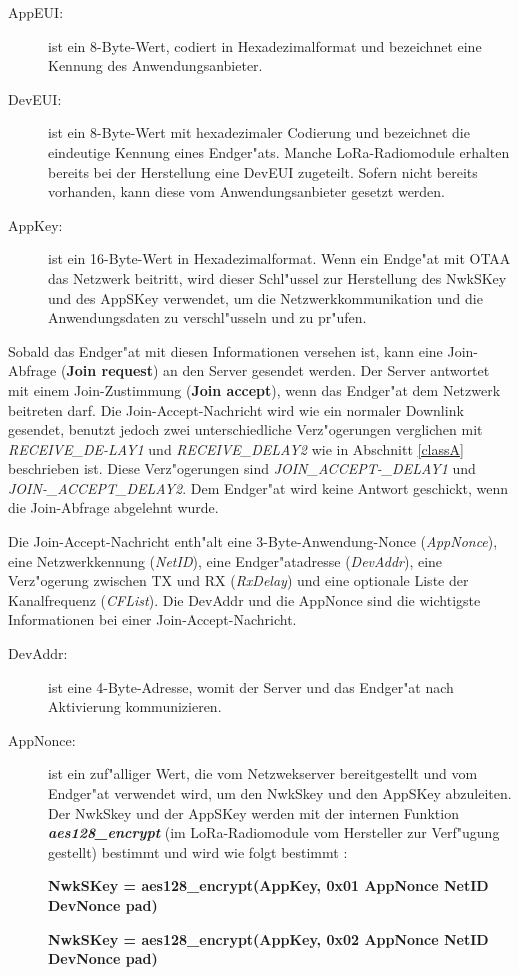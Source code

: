 \begin{description}
	\item[AppEUI:] ist ein 8-Byte-Wert, codiert in Hexadezimalformat und 
	bezeichnet eine Kennung des Anwendungsanbieter.
	\item[DevEUI:] ist ein 8-Byte-Wert mit hexadezimaler Codierung und 
	bezeichnet die eindeutige Kennung eines Endger"ats. Manche 
	LoRa-Radiomodule erhalten bereits bei der Herstellung eine DevEUI zugeteilt. 
	Sofern nicht bereits vorhanden, kann diese vom Anwendungsanbieter gesetzt 
	werden.
	\item[AppKey:] ist ein 16-Byte-Wert in Hexadezimalformat. Wenn ein 
	Endge"at mit OTAA das Netzwerk beitritt, wird dieser Schl"ussel zur 
	Herstellung des NwkSKey und des AppSKey verwendet, um die 
	Netzwerkkommunikation und die Anwendungsdaten zu verschl"usseln und 
	zu pr"ufen. 
\end{description}

Sobald das Endger"at mit diesen Informationen versehen ist, kann eine 
Join-Abfrage (\textbf{Join request}) an den Server gesendet werden. Der Server 
antwortet mit einem Join-Zustimmung (\textbf{Join accept}), wenn das 
Endger"at dem Netzwerk beitreten darf. Die Join-Accept-Nachricht wird 
wie ein normaler Downlink gesendet, benutzt jedoch zwei unterschiedliche 
Verz"ogerungen verglichen mit \textit{RECEIVE\_DE-LAY1} und 
\textit{RECEIVE\_DELAY2} wie in Abschnitt \ref{classA} beschrieben ist.
Diese Verz"ogerungen sind \textit{JOIN\_ACCEPT-\_DELAY1} 
und \textit{JOIN-\_ACCEPT\_DELAY2}. Dem Endger"at wird keine Antwort 
geschickt, wenn die Join-Abfrage abgelehnt wurde.

Die Join-Accept-Nachricht enth"alt eine 3-Byte-Anwendung-Nonce 
(\textit{AppNonce}), eine Netzwerkkennung (\textit{NetID}), eine 
Endger"atadresse (\textit{DevAddr}), eine Verz"ogerung zwischen TX und 
RX (\textit{RxDelay}) und eine optionale Liste der Kanalfrequenz 
(\textit{CFList}). Die DevAddr und die AppNonce sind die wichtigste 
Informationen bei einer Join-Accept-Nachricht.

\begin{description}
	\item[DevAddr:] ist eine 4-Byte-Adresse, womit der Server und das 
	Endger"at nach Aktivierung kommunizieren.   
	
	\item[AppNonce:] ist ein zuf"alliger Wert, die vom Netzwekserver 
	bereitgestellt und vom 
	Endger"at verwendet wird, um den NwkSkey und den AppSKey abzuleiten.
	Der NwkSkey und der AppSKey werden mit der internen Funktion   
	\textbf{\textit{aes128\_encrypt}} (im LoRa-Radiomodule vom 
	Hersteller zur Verf"ugung gestellt) bestimmt und wird wie folgt bestimmt 
	\cite{LoRaWAN}:
	
	\textbf{NwkSKey = aes128\_encrypt(AppKey, 0x01 \textbar AppNonce 
	\textbar NetID \textbar DevNonce \textbar pad)}
	
	\textbf{NwkSKey = aes128\_encrypt(AppKey, 0x02 \textbar AppNonce \textbar 
	NetID \textbar DevNonce \textbar pad)} 
\end{description}

